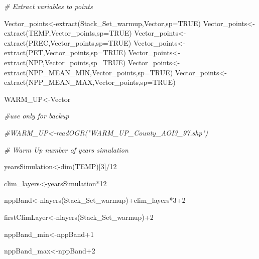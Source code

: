 \documentclass[
  10pt,
  b5paper,
]{book}
\newenvironment{Shaded}{\begin{snugshade}}{\end{snugshade}}
\newcommand{\AttributeTok}[1]{\textcolor[rgb]{0.77,0.63,0.00}{#1}}
\newcommand{\CommentTok}[1]{\textcolor[rgb]{0.56,0.35,0.01}{\textit{#1}}}
\newcommand{\ConstantTok}[1]{\textcolor[rgb]{0.00,0.00,0.00}{#1}}
\newcommand{\DecValTok}[1]{\textcolor[rgb]{0.00,0.00,0.81}{#1}}
\newcommand{\FunctionTok}[1]{\textcolor[rgb]{0.00,0.00,0.00}{#1}}
\newcommand{\NormalTok}[1]{#1}
\newcommand{\OtherTok}[1]{\textcolor[rgb]{0.56,0.35,0.01}{#1}}
\newcommand{\SpecialCharTok}[1]{\textcolor[rgb]{0.00,0.00,0.00}{#1}}
\begin{document}
\begin{Shaded}
\begin{Highlighting}[]
\CommentTok{\# Extract variables to points}

\NormalTok{Vector\_points}\OtherTok{\textless{}{-}}\FunctionTok{extract}\NormalTok{(Stack\_Set\_warmup,Vector,}\AttributeTok{sp=}\ConstantTok{TRUE}\NormalTok{)}
\NormalTok{Vector\_points}\OtherTok{\textless{}{-}}\FunctionTok{extract}\NormalTok{(TEMP,Vector\_points,}\AttributeTok{sp=}\ConstantTok{TRUE}\NormalTok{)}
\NormalTok{Vector\_points}\OtherTok{\textless{}{-}}\FunctionTok{extract}\NormalTok{(PREC,Vector\_points,}\AttributeTok{sp=}\ConstantTok{TRUE}\NormalTok{)}
\NormalTok{Vector\_points}\OtherTok{\textless{}{-}}\FunctionTok{extract}\NormalTok{(PET,Vector\_points,}\AttributeTok{sp=}\ConstantTok{TRUE}\NormalTok{)}
\NormalTok{Vector\_points}\OtherTok{\textless{}{-}}\FunctionTok{extract}\NormalTok{(NPP,Vector\_points,}\AttributeTok{sp=}\ConstantTok{TRUE}\NormalTok{)}
\NormalTok{Vector\_points}\OtherTok{\textless{}{-}}\FunctionTok{extract}\NormalTok{(NPP\_MEAN\_MIN,Vector\_points,}\AttributeTok{sp=}\ConstantTok{TRUE}\NormalTok{)}
\NormalTok{Vector\_points}\OtherTok{\textless{}{-}}\FunctionTok{extract}\NormalTok{(NPP\_MEAN\_MAX,Vector\_points,}\AttributeTok{sp=}\ConstantTok{TRUE}\NormalTok{)}

\NormalTok{WARM\_UP}\OtherTok{\textless{}{-}}\NormalTok{Vector}

\CommentTok{\#use only for backup}

\CommentTok{\#WARM\_UP\textless{}{-}readOGR("WARM\_UP\_County\_AOI3\_97.shp")}

\CommentTok{\# Warm Up number of years simulation }

\NormalTok{yearsSimulation}\OtherTok{\textless{}{-}}\FunctionTok{dim}\NormalTok{(TEMP)[}\DecValTok{3}\NormalTok{]}\SpecialCharTok{/}\DecValTok{12}

\NormalTok{clim\_layers}\OtherTok{\textless{}{-}}\NormalTok{yearsSimulation}\SpecialCharTok{*}\DecValTok{12}

\NormalTok{nppBand}\OtherTok{\textless{}{-}}\FunctionTok{nlayers}\NormalTok{(Stack\_Set\_warmup)}\SpecialCharTok{+}\NormalTok{clim\_layers}\SpecialCharTok{*}\DecValTok{3}\SpecialCharTok{+}\DecValTok{2}

\NormalTok{firstClimLayer}\OtherTok{\textless{}{-}}\FunctionTok{nlayers}\NormalTok{(Stack\_Set\_warmup)}\SpecialCharTok{+}\DecValTok{2}

\NormalTok{nppBand\_min}\OtherTok{\textless{}{-}}\NormalTok{nppBand}\SpecialCharTok{+}\DecValTok{1}

\NormalTok{nppBand\_max}\OtherTok{\textless{}{-}}\NormalTok{nppBand}\SpecialCharTok{+}\DecValTok{2}


\end{Highlighting}
\end{Shaded}
\end{document}
